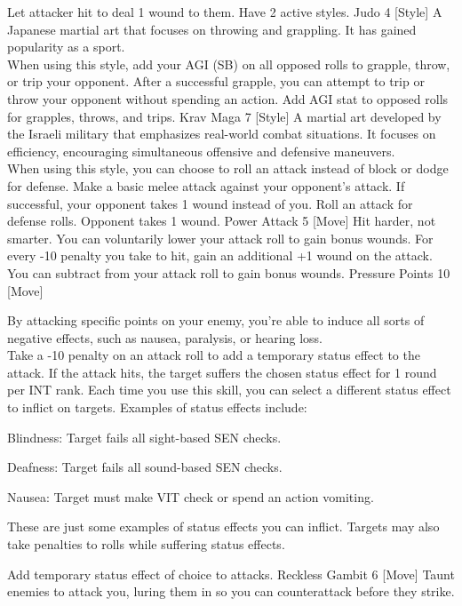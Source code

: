 \begin{path}
{Let attacker hit to deal 1 wound to them. Have 2 active styles.}
\skilldescription
{Judo}
{4}
[Style]
{A Japanese martial art that focuses on throwing and grappling. It has gained popularity as a sport.
\\When using this style, add your AGI (SB) on all opposed rolls to grapple, throw, or trip your opponent. After a successful grapple, you can attempt to trip or throw your opponent without spending an action.}
{Add AGI stat to opposed rolls for grapples, throws, and trips.}
\skilldescription
{Krav Maga}
{7}
[Style]
{A martial art developed by the Israeli military that emphasizes real-world combat situations. It focuses on efficiency, encouraging simultaneous offensive and defensive maneuvers.
\\When using this style, you can choose to roll an attack instead of block or dodge for defense. Make a basic melee attack against your opponent's attack. If successful, your opponent takes 1 wound instead of you.}
{Roll an attack for defense rolls. Opponent takes 1 wound.}
\skilldescription
{Power Attack}
{5}
[Move]
{Hit harder, not smarter. You can voluntarily lower your attack roll to gain bonus wounds. For every -10 penalty you take to hit, gain an additional +1 wound on the attack.}
{You can subtract from your attack roll to gain bonus wounds.}
\skilldescription
{Pressure Points}
{10}
[Move]
{By attacking specific points on your enemy, you're able to induce all sorts of negative effects, such as nausea, paralysis, or hearing loss.
\\Take a -10 penalty on an attack roll to add a temporary status effect to the attack. If the attack hits, the target suffers the chosen status effect for 1 round per INT rank. Each time you use this skill, you can select a different status effect to inflict on targets. Examples of status effects include:
\begin{wldescription}
\item [Blindness:]  Target fails all sight-based SEN checks.
\item [Deafness:]  Target fails all sound-based SEN checks.
\item [Nausea:]  Target must make VIT check or spend an action vomiting.
\end{wldescription}
These are just some examples of status effects you can inflict. Targets may also take penalties to rolls while suffering status effects.}
{Add temporary status effect of choice to attacks.}
\skilldescription
{Reckless Gambit}
{6}
[Move]
{Taunt enemies to attack you, luring them in so you can counterattack before they strike.
}
\end{path}
